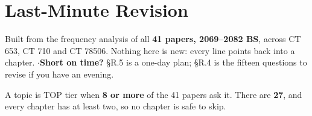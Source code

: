 \cleardoublepage
\section{Last-Minute Revision}

{\color{sub}\footnotesize Built from the frequency analysis of all \textbf{41 papers,
2069--2082 BS}, across CT 653, CT 710 and CT 78506. Nothing here is new: every line
points back into a chapter. \gap$\cdot$\gap \textbf{Short on time?} \S R.5 is a
one-day plan; \S R.4 is the fifteen questions to revise if you have an evening.}

\hr


{\color{sub}\footnotesize A topic is TOP tier when \textbf{8 or more} of the 41 papers
ask it. There are \textbf{27}, and every chapter has at least two, so no chapter is safe
to skip.}

